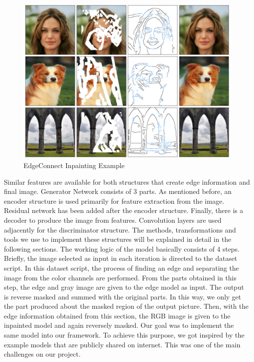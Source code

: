 \begin{figure}[h]
    \centering
    \includegraphics[scale=0.85]{figures/chapter4/ExampleEdgeConnect.PNG}
    \vspace*{5mm}
    \caption{EdgeConnect Inpainting Example \cite{edgeconnect}}
    \label{fig:edgeconnect-example}
\end{figure}

Similar features are available for both structures that create edge information and final image. Generator Network consists of 3 parts. As mentioned before, an encoder structure is used primarily for feature extraction from the image. Residual network has been added after the encoder structure. Finally, there is a decoder to produce the image from features. Convolution layers are used adjacently for the discriminator structure.
The methods, transformations and tools we use to implement these structures will be explained in detail in the following sections.\newline
The working logic of the model basically consists of 4 steps. Briefly, the image selected as input in each iteration is directed to the dataset script. In this dataset script, the process of finding an edge and separating the image from the color channels are performed. From the parts obtained in this step, the edge and gray image are given to the edge model as input. The output is reverse masked and summed with the original parts. In this way, we only get the part produced about the masked region of the output picture. Then, with the edge information obtained from this section, the RGB image is given to the inpainted model and again reversely masked. \newline
Our goal was to implement the same model into our framework. To achieve this purpose, we got inspired by the example models that are publicly shared on internet. This was one of the main challenges on our project.  


